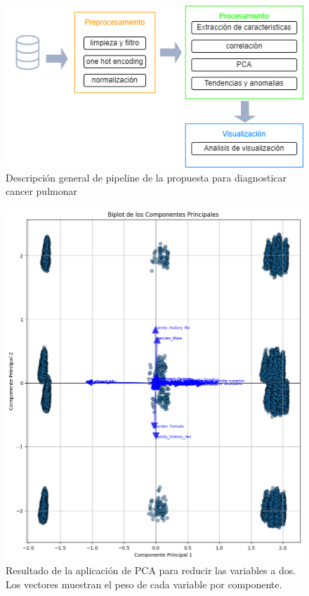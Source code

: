 \documentclass[10pt,journal,compsoc]{IEEEtran}
\begin{document}
\begin{figure}[htb]
    \centering
    \includegraphics[width=\linewidth]{imagenes/pipeline.png} %
    \caption{Descripción general de pipeline de la propuesta para diagnosticar cancer pulmonar}
    \label{fig:pipeline}
\end{figure}


\begin{figure}[htb]
    \centering
    \includegraphics[width=\linewidth]{imagenes/pca_biplot.png}
    \caption{Resultado de la aplicación de PCA para reducir las variables a dos. Los vectores muestran el peso de cada variable por componente.}
    \label{fig:pca}
\end{figure}
\end{document}
